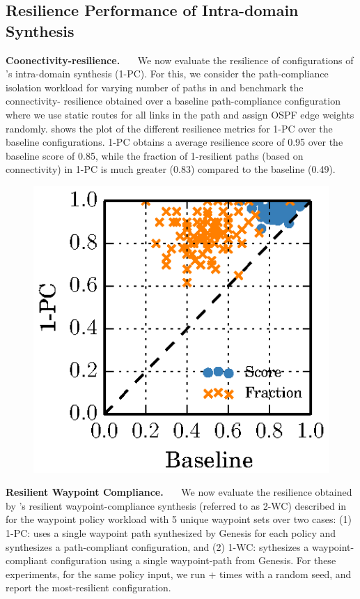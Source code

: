 \subsection{Resilience Performance of Intra-domain Synthesis} \label{sec:mcmceval}
\noindent\textbf{Coonectivity-resilience.}~~~
We now evaluate the resilience of configurations 
of \name's intra-domain synthesis (1-PC). For this, 
we consider the path-compliance isolation workload for
varying number of paths 
in  and benchmark the connectivity-
resilience obtained over a baseline path-compliance 
configuration 
where we use static routes for all links in the path and 
assign OSPF edge weights randomly. 
shows the plot of the different resilience metrics for 
1-PC over the baseline configurations. 1-PC obtains a
average resilience score of 0.95 over the baseline score 
of 0.85, while the fraction of 1-resilient paths (based on
connectivity) in 1-PC is much greater (0.83) compared to 
the baseline (0.49).

\begin{figure}
	\begin{center}
		\includegraphics[width=0.3\columnwidth]{figures/ospfbaselineresilience.eps}
	\end{center} 
\end{figure}
\noindent\textbf{Resilient Waypoint Compliance.}~~~
We now evaluate the resilience obtained by \name's
resilient waypoint-compliance synthesis (referred to as 2-WC)
described in 
for the waypoint policy workload with 5 unique waypoint sets 
over two cases: (1) 1-PC: \name uses a single waypoint path
synthesized by Genesis for each policy 
and synthesizes a path-compliant configuration, and 
(2) 1-WC: \name sythesizes a waypoint-compliant configuration
using a single waypoint-path from Genesis. For these 
experiments, for the same policy input, we run \genesis +  times with a random seed, and report the most-resilient configuration.

